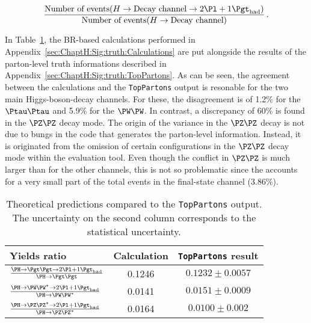 \begin{equation*}
    \frac{\text{Number of events}(H \rightarrow \text{Decay channel} \rightarrow  \dileptau)}{\text{Number of events}(H \rightarrow \text{Decay channel)}}\, .
\end{equation*}

In Table~\ref{tab:ChaptH:Prediction_VS_TopPartons}, the BR-based calculations
performed in Appendix~\ref{sec:ChaptH:Sig:truth:Calculations} are put alongside 
the results of the parton-level truth informations described in Appendix~\ref{sec:ChaptH:Sig:truth:TopPartons}.
As can be seen, the agreement between the calculations and the \texttt{TopPartons} output is resonable for
the two main Higgs-boson-decay channels. For these, the disagreement is of 1.2\% for the $\Ptau\Ptau$  and 
5.9\% for the $\PW \PW$. 
In contrast, a discrepancy of 60\% is found in the $\PZ \PZ$ decay mode. 
The origin of the variance in the $\PZ \PZ$ decay is not due to bungs in the code
that generates the parton-level information. Instead, it is originated from the omission
of certain configurations in the $\PZ \PZ$ decay mode within the evaluation tool.
Even though the conflict in $\PZ \PZ$ is much larger than for the other channels, this is not so problematic
since the \HZZ accounts for a very small part of the total \tHq events in the \dileptau final-state channel  (3.86\%). 


\begin{table}[h]
\centering
\begin{tabular}{l|c|c}
\toprule
Yields ratio								&   Calculation   	& \texttt{TopPartons} result \\
\midrule
$\frac{\Htautau \rightarrow \dileptau }{\Htautau}$  	&   0.1246         	&  $0.1232  \pm 0.0057$ 	\\ 
$\frac{\HWW 	\rightarrow \dileptau}{\HWW}$       	&   0.0141        		&  $0.0151  \pm 0.0009$   \\ 
$\frac{\HZZ 	\rightarrow \dileptau }{\HZZ}$           	&   0.0164         	&  $0.0100  \pm 0.002$     \\ \bottomrule
\end{tabular}
\caption{Theoretical predictions compared to the \texttt{TopPartons} output. 
The uncertainty on the second column corresponds to the statistical uncertainty. }
\label{tab:ChaptH:Prediction_VS_TopPartons}
\end{table}


